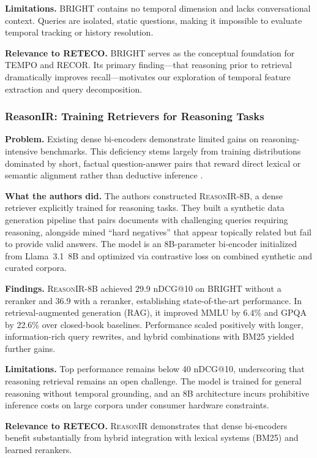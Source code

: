 \textbf{Limitations.} \textsc{BRIGHT} contains no temporal dimension and lacks conversational context. Queries are isolated, static questions, making it impossible to evaluate temporal tracking or history resolution.

\textbf{Relevance to RETECO.} \textsc{BRIGHT} serves as the conceptual foundation for TEMPO and RECOR. Its primary finding---that reasoning prior to retrieval dramatically improves recall---motivates our exploration of temporal feature extraction and query decomposition.

\subsubsection{ReasonIR: Training Retrievers for Reasoning Tasks}
\textbf{Problem.} Existing dense bi-encoders demonstrate limited gains on reasoning-intensive benchmarks. This deficiency stems largely from training distributions dominated by short, factual question-answer pairs that reward direct lexical or semantic alignment rather than deductive inference \cite{reasonir}.

\textbf{What the authors did.} The authors constructed \textsc{ReasonIR-8B}, a dense retriever explicitly trained for reasoning tasks. They built a synthetic data generation pipeline that pairs documents with challenging queries requiring reasoning, alongside mined ``hard negatives'' that appear topically related but fail to provide valid answers. The model is an 8B-parameter bi-encoder initialized from Llama~3.1~8B and optimized via contrastive loss on combined synthetic and curated corpora.

\textbf{Findings.} \textsc{ReasonIR-8B} achieved 29.9 nDCG@10 on \textsc{BRIGHT} without a reranker and 36.9 with a reranker, establishing state-of-the-art performance. In retrieval-augmented generation (RAG), it improved MMLU by 6.4\% and GPQA by 22.6\% over closed-book baselines. Performance scaled positively with longer, information-rich query rewrites, and hybrid combinations with BM25 yielded further gains.

\textbf{Limitations.} Top performance remains below 40 nDCG@10, underscoring that reasoning retrieval remains an open challenge. The model is trained for general reasoning without temporal grounding, and an 8B architecture incurs prohibitive inference costs on large corpora under consumer hardware constraints.

\textbf{Relevance to RETECO.} \textsc{ReasonIR} demonstrates that dense bi-encoders benefit substantially from hybrid integration with lexical systems (BM25) and learned rerankers.

